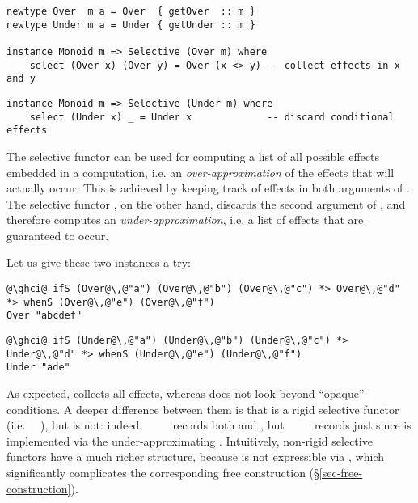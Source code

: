 {\vspace{1mm}
\begin{verbatim}
newtype Over  m a = Over  { getOver  :: m }
newtype Under m a = Under { getUnder :: m }

instance Monoid m => Selective (Over m) where
    select (Over x) (Over y) = Over (x <> y) -- collect effects in x and y
\end{verbatim}
\vspace{1mm}
\begin{verbatim}
instance Monoid m => Selective (Under m) where
    select (Under x) _ = Under x             -- discard conditional effects
\end{verbatim}
\vspace{1mm}

\noindent
The selective functor  can be used for computing a list of all possible
effects embedded in a computation, i.e. an \emph{over-approximation} of the
effects that will actually occur. This is achieved by keeping track of effects
in both arguments of . The selective functor , on the other
hand, discards the second argument of , and therefore computes an
\emph{under-approximation}, i.e. a list of effects that are guaranteed to occur.

\noindent
Let us give these two instances a try:

\vspace{1mm}
\begin{verbatim}
@\ghci@ ifS (Over@\,@"a") (Over@\,@"b") (Over@\,@"c") *> Over@\,@"d" *> whenS (Over@\,@"e") (Over@\,@"f")
Over "abcdef"
\end{verbatim}
\vspace{1mm}
\begin{verbatim}
@\ghci@ ifS (Under@\,@"a") (Under@\,@"b") (Under@\,@"c") *> Under@\,@"d" *> whenS (Under@\,@"e") (Under@\,@"f")
Under "ade"
\end{verbatim}
\vspace{1mm}

\noindent
As expected,  collects all effects, whereas  does not look
beyond ``opaque'' conditions. A deeper difference between them is that 
is a rigid selective functor (i.e. \hs{<*>}~\hs{=}~), but  is
not: indeed, ~~\hs{<*>}~~ records both
 and , but ~~~~
records just  since  is implemented via the under-approximating
. Intuitively, non-rigid selective functors have a much richer
structure, because \hs{<*>} is not expressible via , which
significantly complicates the corresponding free construction
(\S\ref{sec-free-construction}).

}
